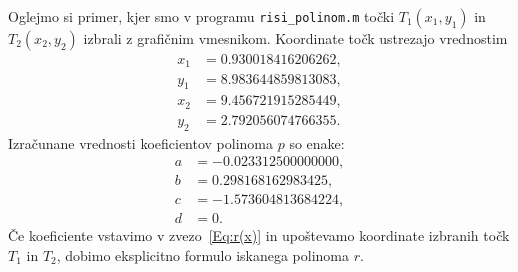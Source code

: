\documentclass[a4paper]{article}
\begin{document}
Oglejmo si primer, kjer smo v programu \texttt{risi\_polinom.m} točki $T_1(x_1,y_1)$ in $T_2(x_2,y_2)$ izbrali z grafičnim vmesnikom. Koordinate točk ustrezajo vrednostim
\begin{align*}
x_1 &= 0.930018416206262, \\
y_1 &= 8.983644859813083, \\
x_2 &= 9.456721915285449, \\
y_2 &= 2.792056074766355.
\end{align*}
%
Izračunane vrednosti koeficientov polinoma $p$ so enake:
\begin{align*}
a &= -0.023312500000000, \\
b &= 0.298168162983425, \\ 
c &= -1.573604813684224, \\ 
d &= 0.
\end{align*}
Če koeficiente vstavimo v zvezo~\eqref{Eq:r(x)} in upoštevamo koordinate izbranih točk $T_1$ in $T_2$, dobimo eksplicitno formulo iskanega polinoma $r$.
\end{document}
